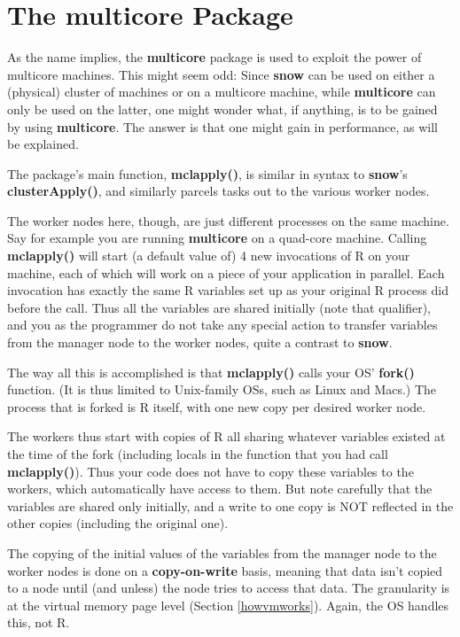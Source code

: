 \section{The multicore Package}

As the name implies, the {\bf multicore} package is used to exploit the
power of multicore machines.  This might seem odd: Since {\bf snow} can
be used on either a (physical) cluster of machines or on a multicore
machine, while {\bf multicore} can only be used on the latter, one might
wonder what, if anything, is to be gained by using {\bf multicore}.  The
answer is that one might gain in performance, as will be explained.

The package's main function, {\bf mclapply()}, is similar in syntax to
{\bf snow}'s {\bf clusterApply()}, and similarly parcels tasks out to
the various worker nodes.

The worker nodes here, though, are just different processes on the same
machine.  Say for example you are running {\bf multicore} on a quad-core
machine.  Calling {\bf mclapply()} will start (a default value of) 4 new
invocations of R on your machine, each of which will work on a piece of
your application in parallel.  Each invocation has exactly the same R
variables set up as your original R process did before the call.  Thus
all the variables are shared initially (note that qualifier), and you as
the programmer do not take any special action to transfer variables from
the manager node to the worker nodes, quite a contrast to {\bf snow}.

The way all this is accomplished is that {\bf mclapply()} calls your OS'
{\bf fork()} function.  (It is thus limited to Unix-family OSs, such as
Linux and Macs.)  The process that is forked is R itself, with one new
copy per desired worker node.

The workers thus start with copies of R all sharing whatever variables
existed at the time of the fork (including locals in the function that
you had call {\bf mclapply()}).  Thus your code does not have to copy
these variables to the workers, which automatically have access to them.
But note carefully that the variables are shared only initially, and a
write to one copy is NOT reflected in the other copies (including the
original one).

The copying of the initial values of the variables from the manager node
to the worker nodes is done on a {\bf copy-on-write} basis, meaning that
data isn't copied to a node until (and unless) the node tries to access
that data.  The granularity is at the virtual memory page level (Section
\ref{howvmworks}).  Again, the OS handles this, not R.

